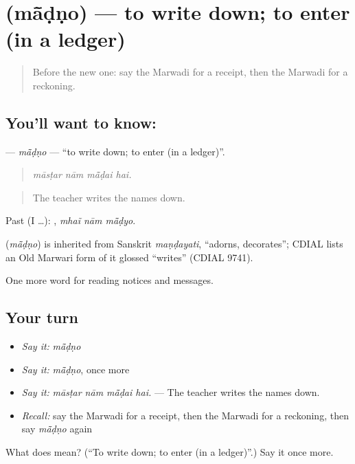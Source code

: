 \section[\texorpdfstring{\mw{मांडणो} (mā̃ḍṇo)}{मांडणो (mā̃ḍṇo)}]{ (mā̃ḍṇo) — to write down; to enter (in a ledger)}

\label{lesson:MW-C199-madno}



\begin{quote}
Before the new one: say the Marwadi for a receipt, then the Marwadi for a reckoning.
\end{quote}

\subsection*{You'll want to know: }
\textbf{} — \emph{mā̃ḍṇo} — \textquotedblleft{}to write down; to enter (in a ledger)\textquotedblright{}.

\begin{quote}
   
\end{quote}

\begin{quote}
\emph{māsṭar nām mā̃ḍai hai.}
\end{quote}

\begin{quote}
The teacher writes the names down.
\end{quote}

Past (I …):   , \emph{mhaĩ nām mā̃ḍyo}.

\begin{cousinweb}
\textbf{} (\emph{mā̃ḍṇo}) is inherited from Sanskrit \emph{maṇḍayati}, \textquotedblleft{}adorns, decorates\textquotedblright{}; CDIAL lists an Old Marwari form of it glossed \textquotedblleft{}writes\textquotedblright{} (CDIAL 9741).
\end{cousinweb}

\begin{grammarlens}[title={What you've built}]
One more word for reading notices and messages.
\end{grammarlens}

\subsection*{Your turn}
\begin{itemize}
\raggedright
  \item \emph{Say it:} \emph{mā̃ḍṇo}
  \item \emph{Say it:} \emph{mā̃ḍṇo}, once more
  \item \emph{Say it:} \emph{māsṭar nām mā̃ḍai hai.} — The teacher writes the names down.
  \item \emph{Recall:} say the Marwadi for a receipt, then the Marwadi for a reckoning, then say \emph{mā̃ḍṇo} again
\end{itemize}

\begin{tcolorbox}[breakable,colback=teal!4,colframe=teal!35!black,title={Before you move on}]
What does  mean? (\textquotedblleft{}To write down; to enter (in a ledger)\textquotedblright{}.) Say it once more.
\end{tcolorbox}
